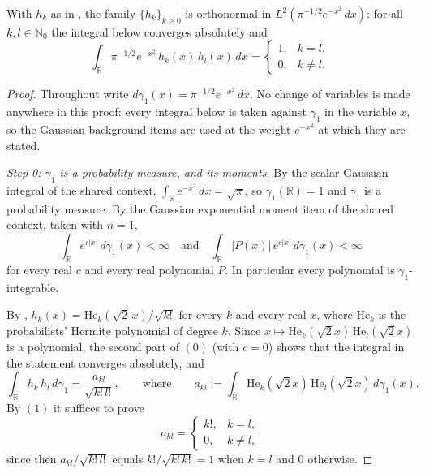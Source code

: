 \begin{lemma}
With $h_k$ as in , the family $\{h_k\}_{k \geq 0}$ is
orthonormal in $L^2(\pi^{-1/2}e^{-x^2}\,dx)$: for all $k, l \in \mathbb{N}_0$ the
integral below converges absolutely and
\[
  \int_{\mathbb{R}} \pi^{-1/2} e^{-x^2}\, h_k(x)\, h_l(x)\, dx
    = \begin{cases} 1, & k = l,\\ 0, & k \neq l.\end{cases}
\]
\end{lemma}
\begin{proof}
Throughout write $d\gamma_1(x) = \pi^{-1/2}e^{-x^2}\,dx$.  No change of
variables is made anywhere in this proof: every integral below is taken against
$\gamma_1$ in the variable $x$, so the Gaussian background items are used at the
weight $e^{-x^2}$ at which they are stated.

\emph{Step 0: $\gamma_1$ is a probability measure, and its moments.}
By the scalar Gaussian integral of the shared context,
$\int_{\mathbb{R}} e^{-x^2}\,dx = \sqrt\pi$, so $\gamma_1(\mathbb{R}) = 1$ and
$\gamma_1$ is a probability measure.  By the Gaussian exponential moment item of
the shared context, taken with $n = 1$,
\begin{equation*}
  \int_{\mathbb{R}} e^{c|x|}\, d\gamma_1(x) < \infty
  \quad\text{and}\quad
  \int_{\mathbb{R}} |P(x)|\, e^{c|x|}\, d\gamma_1(x) < \infty
  \tag{0}
\end{equation*}
for every real $c$ and every real polynomial $P$.  In particular every
polynomial is $\gamma_1$-integrable.

By , $h_k(x) = \mathrm{He}_k(\sqrt2\,x)/\sqrt{k!}$ for every
$k$ and every real $x$, where $\mathrm{He}_k$ is the probabilists' Hermite
polynomial of degree $k$.  Since $x \mapsto \mathrm{He}_k(\sqrt2 x)\,
\mathrm{He}_l(\sqrt2 x)$ is a polynomial, the second part of $(0)$ (with
$c = 0$) shows that the integral in the statement converges absolutely, and
\begin{equation*}
  \int_{\mathbb{R}} h_k\, h_l\, d\gamma_1
    = \frac{a_{kl}}{\sqrt{k!\,l!}},
  \qquad\text{where}\qquad
  a_{kl} := \int_{\mathbb{R}} \mathrm{He}_k(\sqrt2 x)\,\mathrm{He}_l(\sqrt2 x)\,
    d\gamma_1(x) .
  \tag{1}
\end{equation*}
By $(1)$ it suffices to prove
\begin{equation*}
  a_{kl} = \begin{cases} k!, & k = l,\\ 0, & k \neq l,\end{cases}
  \tag{$\ast$}
\end{equation*}
since then $a_{kl}/\sqrt{k!\,l!}$ equals $k!/\sqrt{k!\,k!} = 1$ when $k = l$ and
$0$ otherwise.


\end{proof}
